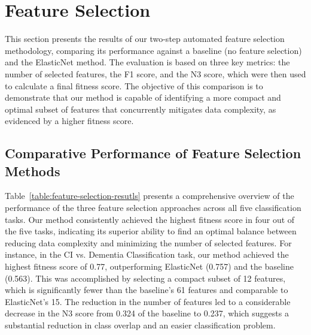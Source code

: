 \section{Feature Selection}
This section presents the results of our two-step automated feature selection methodology, comparing its performance against a baseline (no feature selection) and the ElasticNet method. The evaluation is based on three key metrics: the number of selected features, the F1 score, and the N3 score, which were then used to calculate a final fitness score. The objective of this comparison is to demonstrate that our method is capable of identifying a more compact and optimal subset of features that concurrently mitigates data complexity, as evidenced by a higher fitness score.

\subsection{Comparative Performance of Feature Selection Methods}
Table~\ref{table:feature-selection-resutls} presents a comprehensive overview of the performance of the three feature selection approaches across all five classification tasks. Our method consistently achieved the highest fitness score in four out of the five tasks, indicating its superior ability to find an optimal balance between reducing data complexity and minimizing the number of selected features. For instance, in the CI vs. Dementia Classification task, our method achieved the highest fitness score of 0.77, outperforming ElasticNet (0.757) and the baseline (0.563). This was accomplished by selecting a compact subset of 12 features, which is significantly fewer than the baseline's 61 features and comparable to ElasticNet's 15. The reduction in the number of features led to a considerable decrease in the N3 score from 0.324 of the baseline to 0.237, which suggests a substantial reduction in class overlap and an easier classification problem.

